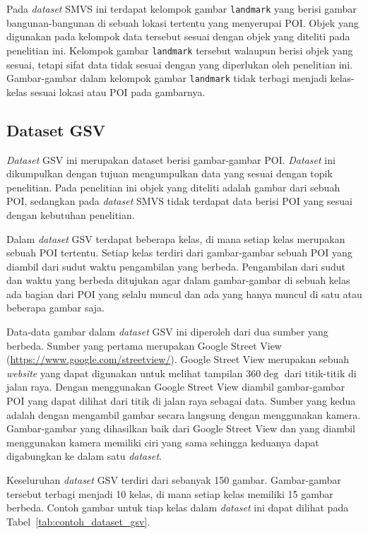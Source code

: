 Pada \textit{dataset} SMVS ini terdapat kelompok gambar \texttt{landmark} yang berisi gambar bangunan-bangunan di sebuah lokasi tertentu yang menyerupai POI. Objek yang digunakan pada kelompok data tersebut sesuai dengan objek yang diteliti pada penelitian ini. Kelompok gambar \texttt{landmark} tersebut walaupun berisi objek yang sesuai, tetapi sifat data tidak sesuai dengan yang diperlukan oleh penelitian ini. Gambar-gambar dalam kelompok gambar \texttt{landmark} tidak terbagi menjadi kelas-kelas sesuai lokasi atau POI pada gambarnya.

\subsection{Dataset GSV}
\label{subsec:dataset_gsv}
\textit{Dataset} GSV ini merupakan dataset berisi gambar-gambar POI. \textit{Dataset} ini dikumpulkan dengan tujuan mengumpulkan data yang sesuai dengan topik penelitian. Pada penelitian ini objek yang diteliti adalah gambar dari sebuah POI, sedangkan pada \textit{dataset} SMVS tidak terdapat data berisi POI yang sesuai dengan kebutuhan penelitian. 

Dalam \textit{dataset} GSV terdapat beberapa kelas, di mana setiap kelas merupakan sebuah POI tertentu. Setiap kelas terdiri dari gambar-gambar sebuah POI yang diambil dari sudut waktu pengambilan yang berbeda. Pengambilan dari sudut dan waktu yang berbeda ditujukan agar dalam gambar-gambar di sebuah kelas ada bagian dari POI yang selalu muncul dan ada yang hanya muncul di satu atau beberapa gambar saja. 

Data-data gambar dalam \textit{dataset} GSV ini diperoleh dari dua sumber yang berbeda. Sumber yang pertama merupakan Google Street View (\url{https://www.google.com/streetview/}). Google Street View merupakan sebuah \textit{website} yang dapat digunakan untuk melihat tampilan $360\deg$ dari titik-titik di jalan raya. Dengan menggunakan Google Street View diambil gambar-gambar POI yang dapat dilihat dari titik di jalan raya sebagai data. Sumber yang kedua adalah dengan mengambil gambar secara langsung dengan menggunakan kamera. Gambar-gambar yang dihasilkan baik dari Google Street View dan yang diambil menggunakan kamera memiliki ciri yang sama sehingga keduanya dapat digabungkan ke dalam satu \textit{dataset}.

Keseluruhan \textit{dataset} GSV terdiri dari sebanyak 150 gambar. Gambar-gambar tersebut terbagi menjadi 10 kelas, di mana setiap kelas memiliki 15 gambar berbeda. Contoh gambar untuk tiap kelas dalam \textit{dataset} ini dapat dilihat pada Tabel~\ref{tab:contoh_dataset_gsv}.
\newpage

